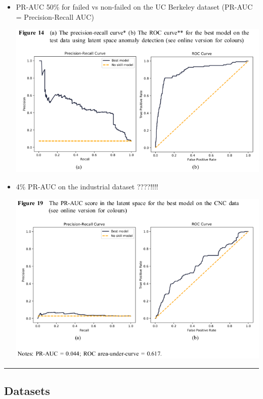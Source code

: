 \documentclass[
  letterpaper,
  DIV=11,
  numbers=noendperiod]{scrartcl}
\begin{document}
\begin{itemize}
  \begin{itemize}
  \item
    PR-AUC 50\% for failed vs non-failed on the UC Berkeley dataset
    (PR-AUC = Precision-Recall AUC)

    \includegraphics{img/2023-01-12-11-44-23.png}
  \item
    4\% PR-AUC on the industrial dataset ????!!!!

    \includegraphics{img/2023-01-12-11-45-14.png}
  \end{itemize}
\end{itemize}

\begin{center}\rule{0.5\linewidth}{0.5pt}\end{center}

\hypertarget{datasets}{%
\subsection{Datasets}\label{datasets}}
\end{document}
